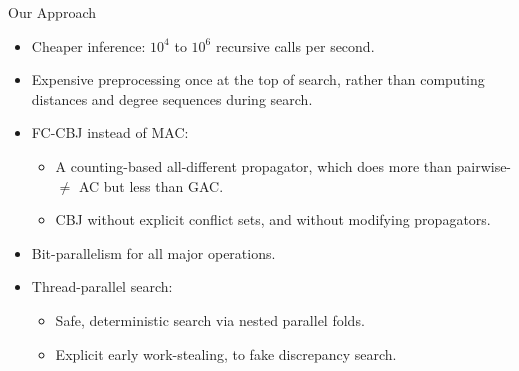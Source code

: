 \documentclass{beamer}
\begin{document}
\begin{frame}{Our Approach}
    \begin{itemize}
        \item Cheaper inference: $10^4$ to $10^6$ recursive calls per second.
        \item Expensive preprocessing once at the top of search, rather than computing distances and
            degree sequences during search.
        \item FC-CBJ instead of MAC:
            \begin{itemize}
                \item A counting-based all-different propagator, which does more
                    than pairwise-$\ne$ AC but less than GAC.
                \item CBJ without explicit conflict sets, and without modifying propagators.
            \end{itemize}
        \item Bit-parallelism for all major operations.
        \item Thread-parallel search:
            \begin{itemize}
                \item Safe, deterministic search via nested parallel folds.
                \item Explicit early work-stealing, to fake discrepancy search.
            \end{itemize}
    \end{itemize}
\end{frame}
\end{document}
